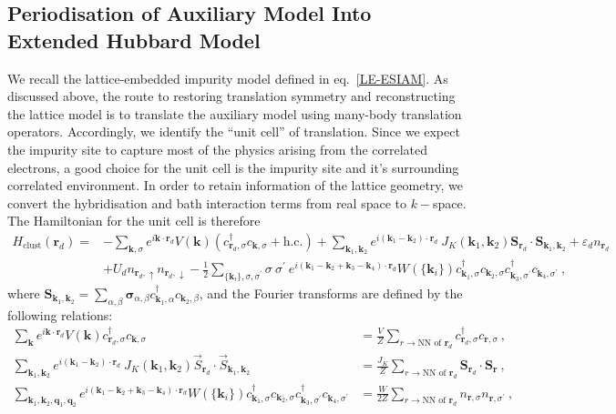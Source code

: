 \subsection{Periodisation of Auxiliary Model Into Extended Hubbard Model}\label{hamiltonianTile}
We recall the lattice-embedded impurity model defined in eq.~\ref{LE-ESIAM}.
As discussed above, the route to restoring translation symmetry and reconstructing the lattice model is to translate the auxiliary model using many-body translation operators.
Accordingly, we identify the ``unit cell'' of translation.
Since we expect the impurity site to capture most of the physics arising from the correlated electrons, a good choice for the unit cell is the impurity site and it's surrounding correlated environment. In order to retain information of the lattice geometry, we convert the hybridisation and bath interaction terms from real space to \(k-\)space. The Hamiltonian for the unit cell is therefore
\begin{equation}\begin{aligned}\label{clusterHamiltonian}
	H_\text{clust}(\bm r_d) =& -\sum_{{\bm k},\sigma} e^{i \bm k \cdot \bm r_d } V({\bm k})(c^\dagger_{{\bm r}_d,\sigma} c_{{\bm k},\sigma} + \text{h.c.}) + \sum_{\bm k_1, \bm k_2} e^{i (\bm k_1 - \bm k_2) \cdot \bm r_d }~J_K({\bm k_1, \bm k_2}) {\bm S}_{\bm r_d} \cdot {\bm S}_{\bm k_1, \bm k_2} + \varepsilon_d n_{\bm r_d}\\
							 & + U_d n_{{\bm r_d}, \uparrow} n_{{\bm r_d}, \downarrow}- \frac{1}{2}\sum_{\{\bm k_i\},\sigma,\sigma^\prime}\sigma~\sigma^\prime~e^{i (\bm k_1 - \bm k_2 + \bm k_3 - \bm k_4) \cdot \bm r_d } W(\{\bm k_i\}) c^\dagger_{\bm k_1, \sigma}c_{\bm k_2, \sigma}c^\dagger_{\bm k_3, \sigma^\prime}c_{\bm k_4, \sigma^\prime}~,
\end{aligned}\end{equation}
where \({\bm S}_{\bm k_1, \bm k_2} = \sum_{\alpha,\beta}{\bm \sigma}_{\alpha,\beta} c^\dagger_{\bm k_1,\alpha}c_{\bm k_2,\beta}\), and the Fourier transforms are defined by the following relations:
\begin{equation}\begin{aligned}\label{FTauxiliary}
	\sum_{{\bm k}} e^{i \bm k \cdot \bm r_d } V({\bm k})c^\dagger_{{\bm r}_d,\sigma} c_{{\bm k},\sigma} &= \frac{V}{Z}\sum_{r \to \text{NN of }\bm r_d} c^\dagger_{{\bm r}_d,\sigma}c_{{\bm r},\sigma}~,\\
	\sum_{\bm k_1, \bm k_2} e^{i (\bm k_1 - \bm k_2) \cdot \bm r_d }~J_K({\bm k_1, \bm k_2}) \vec{S}_{\bm r_d} \cdot \vec{S}_{\bm k_1, \bm k_2} &= \frac{J_K}{Z}\sum_{r \to \text{NN of }\bm r_d} {\bm S}_{\bm r_d} \cdot {\bm S}_{\bm r}~,\\
	\sum_{\bm k_1, \bm k_2, \bm q_1, \bm q_2}e^{i (\bm k_1 - \bm k_2 + \bm k_3 - \bm k_4) \cdot \bm r_d } W(\{\bm k_i\}) c^\dagger_{\bm k_1, \sigma}c_{\bm k_2, \sigma}c^\dagger_{\bm k_3, \sigma^\prime}c_{\bm k_4, \sigma^\prime} &= \frac{W}{2Z}\sum_{r \to \text{NN of }\bm r_d} n_{\bm r, \sigma}n_{\bm r, \sigma^\prime}~,
\end{aligned}\end{equation}


